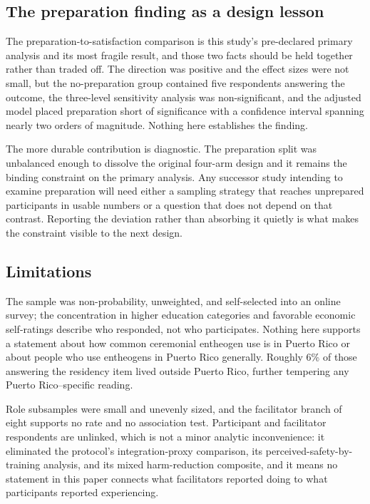 \documentclass[12pt]{article}
\begin{document}
\subsection{The preparation finding as a design lesson}

The preparation-to-satisfaction comparison is this study's pre-declared primary analysis and its most
fragile result, and those two facts should be held together rather than traded off. The direction was
positive and the effect sizes were not small, but the no-preparation group contained five respondents
answering the outcome, the three-level sensitivity analysis was non-significant, and the adjusted model
placed preparation short of significance with a confidence interval spanning nearly two orders of
magnitude. Nothing here establishes the finding.

The more durable contribution is diagnostic. The preparation split was unbalanced enough to dissolve the
original four-arm design and it remains the binding constraint on the primary analysis. Any successor study
intending to examine preparation will need either a sampling strategy that reaches unprepared participants
in usable numbers or a question that does not depend on that contrast. Reporting the deviation rather than
absorbing it quietly is what makes the constraint visible to the next design.

\subsection{Limitations}

The sample was non-probability, unweighted, and self-selected into an online survey; the concentration in
higher education categories and favorable economic self-ratings describe who responded, not who
participates. Nothing here supports a statement about how common ceremonial entheogen use is in Puerto
Rico or about people who use entheogens in Puerto Rico generally. Roughly 6\% of those answering the
residency item lived outside Puerto Rico, further tempering any Puerto Rico--specific reading.

Role subsamples were small and unevenly sized, and the facilitator branch of eight supports no rate and no
association test. Participant and facilitator respondents are unlinked, which is not a minor analytic
inconvenience: it eliminated the protocol's integration-proxy comparison, its perceived-safety-by-training
analysis, and its mixed harm-reduction composite, and it means no statement in this paper connects what
facilitators reported doing to what participants reported experiencing.
\end{document}
